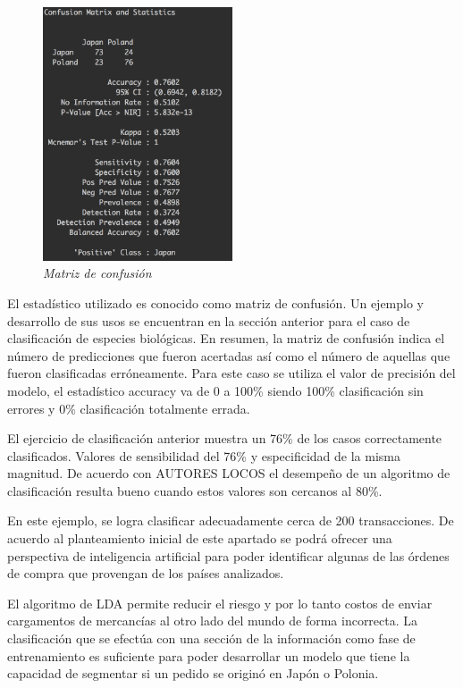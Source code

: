 \documentclass[letterpaper,12pt, spanish, oneside]{book} %
\begin{document}
\begin{figure}[H]
\centering
\includegraphics[width=0.5\textwidth]{marketing4.png}
\caption{\label{fig:frog2}\textit{Matriz de confusión}}
\end{figure}


El estadístico utilizado es conocido como matriz de confusión. Un ejemplo y desarrollo de sus usos se encuentran en la sección anterior para el caso de clasificación de especies biológicas. En resumen, la matriz de confusión indica el número de predicciones que fueron acertadas así como el número de aquellas que fueron clasificadas erróneamente. Para este caso se utiliza el valor de precisión del modelo, el estadístico accuracy va de 0 a 100\% siendo 100\% clasificación sin errores y 0\% clasificación totalmente errada. 

El ejercicio de clasificación anterior muestra un 76\% de los casos correctamente clasificados. Valores de sensibilidad del 76\% y especificidad de la misma magnitud. De acuerdo con AUTORES LOCOS el desempeño de un algoritmo de clasificación resulta bueno cuando estos valores son cercanos al 80\%.

En este ejemplo, se logra clasificar adecuadamente cerca de 200 transacciones. De acuerdo al planteamiento inicial de este apartado se podrá ofrecer una perspectiva de inteligencia artificial para poder identificar algunas de las órdenes de compra que provengan de los países analizados. 

El algoritmo de LDA permite reducir el riesgo y por lo tanto costos de enviar cargamentos de mercancías al otro lado del mundo de forma incorrecta. La clasificación que se efectúa con una sección de la información como fase de entrenamiento es suficiente para poder desarrollar un modelo que tiene la capacidad de segmentar si un pedido se originó en Japón o Polonia.
\end{document}
